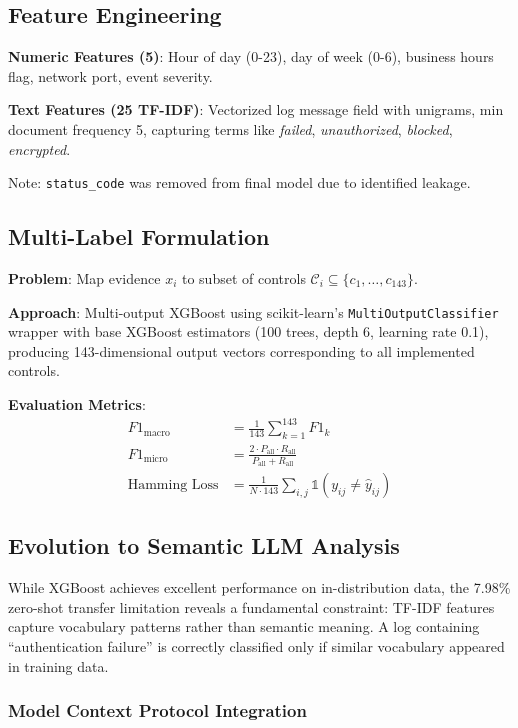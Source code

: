 \documentclass[11pt,conference]{IEEEtran}
\begin{document}
\subsection{Feature Engineering}

\textbf{Numeric Features (5)}: Hour of day (0-23), day of week (0-6), business hours flag, network port, event severity.

\textbf{Text Features (25 TF-IDF)}: Vectorized log message field with unigrams, min document frequency 5, capturing terms like \textit{failed}, \textit{unauthorized}, \textit{blocked}, \textit{encrypted}.

Note: \texttt{status\_code} was removed from final model due to identified leakage.

\subsection{Multi-Label Formulation}

\textbf{Problem}: Map evidence $x_i$ to subset of controls $\mathcal{C}_i \subseteq \{c_1, \ldots, c_{143}\}$.

\textbf{Approach}: Multi-output XGBoost using scikit-learn's \texttt{MultiOutputClassifier} wrapper with base XGBoost estimators (100 trees, depth 6, learning rate 0.1), producing 143-dimensional output vectors corresponding to all implemented controls.

\textbf{Evaluation Metrics}:
\begin{align}
F1_{\text{macro}} &= \frac{1}{143}\sum_{k=1}^{143} F1_k \\
F1_{\text{micro}} &= \frac{2 \cdot P_{\text{all}} \cdot R_{\text{all}}}{P_{\text{all}} + R_{\text{all}}} \\
\text{Hamming Loss} &= \frac{1}{N \cdot 143}\sum_{i,j} \mathbb{1}(y_{ij} \neq \hat{y}_{ij})
\end{align}

\subsection{Evolution to Semantic LLM Analysis}

While XGBoost achieves excellent performance on in-distribution data, the 7.98\% zero-shot transfer limitation reveals a fundamental constraint: TF-IDF features capture vocabulary patterns rather than semantic meaning. A log containing ``authentication failure'' is correctly classified only if similar vocabulary appeared in training data.

\subsubsection{Model Context Protocol Integration}
\end{document}
